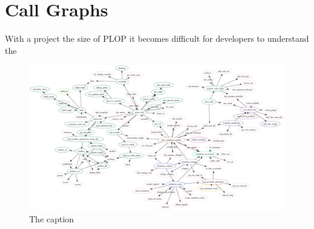 \section{Call Graphs}
\label{section:unsorted/call_graphs}

With a project the size of PLOP it becomes difficult for developers to understand the 

\begin{figure}[h]
    \centering
    \includegraphics[width=1.0\textwidth,height=0.9\textheight,keepaspectratio]{figures/plop_connected_sfdp.png}
    \caption{The caption}
    \label{figure:mutation_call_graph}
\end{figure}

